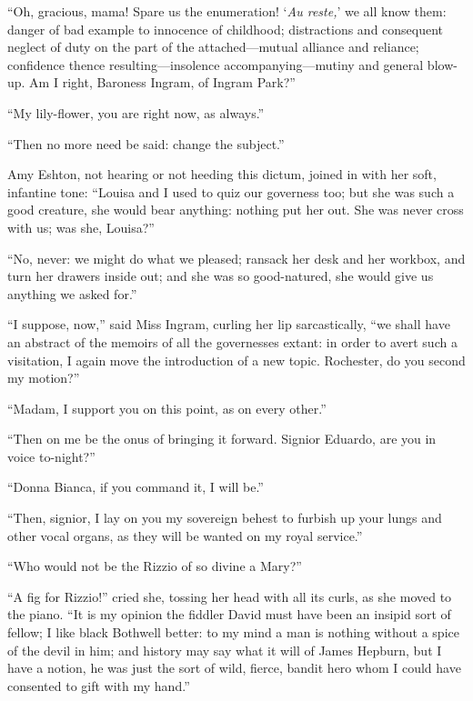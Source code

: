 \enquote{Oh, gracious, mama! Spare us the enumeration! \foreignquote{french}{\emph{Au reste,}} we %
	all know them: danger of bad example to innocence of childhood;
	distractions and consequent neglect of duty on the part of the
	attached---mutual alliance and reliance; confidence thence
	resulting---insolence accompanying---mutiny and general blow-up. Am I
	right, Baroness Ingram, of Ingram Park?}

\enquote{My lily-flower, you are right now, as always.}

\enquote{Then no more need be said: change the subject.}

Amy Eshton, not hearing or not heeding this dictum, joined in with her
soft, infantine tone: \enquote{Louisa and I used to quiz our governess
	too; but she was such a good creature, she would bear anything: nothing
	put her out. She was never cross with us; was she, Louisa?}

\enquote{No, never: we might do what we pleased; ransack her desk and
	her workbox, and turn her drawers inside out; and she was so
	good-natured, she would give us anything we asked for.}

\enquote{I suppose, now,} said Miss Ingram, curling her lip
sarcastically, \enquote{we shall have an abstract of the memoirs of all
	the governesses extant: in order to avert such a visitation, I again
	move the introduction of a new topic. \Mr{} Rochester, do you second my
	motion?}

\enquote{Madam, I support you on this point, as on every other.}

\enquote{Then on me be the onus of bringing it forward. Signior
	Eduardo, are you in voice to-night?}

\enquote{Donna Bianca, if you command it, I will be.}

\enquote{Then, signior, I lay on you my sovereign behest to furbish up
	your lungs and other vocal organs, as they will be wanted on my royal
	service.}

\enquote{Who would not be the Rizzio of so divine a Mary?}

\enquote{A fig for Rizzio!} cried she, tossing her head with all its
curls, as she moved to the piano. \enquote{It is my opinion the fiddler
	David must have been an insipid sort of fellow; I like black Bothwell
	better: to my mind a man is nothing without a spice of the devil in him;
	and history may say what it will of James Hepburn, but I have a notion,
	he was just the sort of wild, fierce, bandit hero whom I could have
	consented to gift with my hand.}

